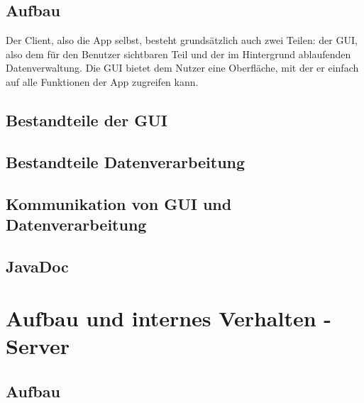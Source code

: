 \documentclass[parskip=full,11pt]{scrartcl}
\begin{document}
\subsection{Aufbau}
Der Client, also die App selbst, besteht grundsätzlich auch zwei Teilen:
der GUI, also dem für den Benutzer sichtbaren Teil und der im Hintergrund ablaufenden Datenverwaltung.
Die GUI bietet dem Nutzer eine Oberfläche, mit der er einfach auf alle Funktionen der App zugreifen kann.
%

\subsection{Bestandteile der GUI}



\subsection{Bestandteile Datenverarbeitung}

\subsection{Kommunikation von GUI und Datenverarbeitung}

\subsection{JavaDoc}

\pagebreak
\section{Aufbau und internes Verhalten - Server}

\subsection{Aufbau}
\end{document}

